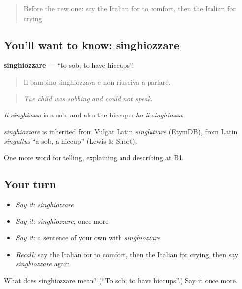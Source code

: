 \label{lesson:IT-C476-singhiozzare}



\begin{quote}
Before the new one: say the Italian for to comfort, then the Italian for crying.
\end{quote}

\subsection*{You'll want to know: singhiozzare}
\textbf{singhiozzare} — \textquotedblleft{}to sob; to have hiccups\textquotedblright{}.

\begin{quote}
Il bambino singhiozzava e non riusciva a parlare.
\end{quote}

\begin{quote}
\emph{The child was sobbing and could not speak.}
\end{quote}

\emph{Il singhiozzo} is a sob, and also the hiccups: \emph{ho il singhiozzo}.

\begin{cousinweb}
\emph{singhiozzare} is inherited from Vulgar Latin \emph{singlutiāre} (EtymDB), from Latin \emph{singultus} \textquotedblleft{}a sob, a hiccup\textquotedblright{} (Lewis \& Short).
\end{cousinweb}

\begin{grammarlens}[title={What you've built}]
One more word for telling, explaining and describing at B1.
\end{grammarlens}

\subsection*{Your turn}
\begin{itemize}
\raggedright
  \item \emph{Say it:} \emph{singhiozzare}
  \item \emph{Say it:} \emph{singhiozzare}, once more
  \item \emph{Say it:} a sentence of your own with \emph{singhiozzare}
  \item \emph{Recall:} say the Italian for to comfort, then the Italian for crying, then say \emph{singhiozzare} again
\end{itemize}

\begin{tcolorbox}[breakable,colback=teal!4,colframe=teal!35!black,title={Before you move on}]
What does singhiozzare mean? (\textquotedblleft{}To sob; to have hiccups\textquotedblright{}.) Say it once more.
\end{tcolorbox}
